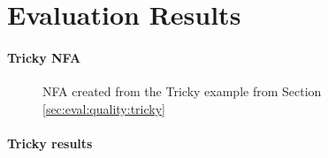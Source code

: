 \chapter{Evaluation Results}\label{appendix:automaton}

\subsubsection{Tricky NFA}
\begin{figure}[ht!]
	\centering
	\caption{NFA created from the Tricky example from Section \ref{sec:eval:quality:tricky}}
	\label{fig:appendix:trickyNFA}
\end{figure}

\subsubsection{Tricky results}
